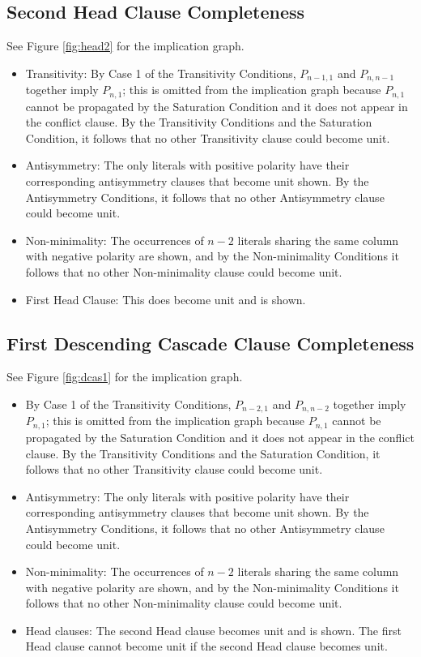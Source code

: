 \documentclass[a4paper,UKenglish,cleveref, autoref, thm-restate]{lipics-v2021}
\begin{document}
\subsection{Second Head Clause Completeness}
See Figure \ref{fig:head2} for the implication graph.
\begin{itemize}
    \item Transitivity: By Case 1 of the Transitivity Conditions, $P_{n - 1, 1}$ and $P_{n, n - 1}$ together imply $P_{n, 1}$; this is omitted from the implication graph because $P_{n, 1}$ cannot be propagated by the Saturation Condition and it does not appear in the conflict clause. By the Transitivity Conditions and the Saturation Condition, it follows that no other Transitivity clause could become unit.
    \item Antisymmetry: The only literals with positive polarity have their corresponding antisymmetry clauses that become unit shown. By the Antisymmetry Conditions, it follows that no other Antisymmetry clause could become unit. 
    \item Non-minimality: The occurrences of $n - 2$ literals sharing the same column with negative polarity are shown, and by the Non-minimality Conditions it follows that no other Non-minimality clause could become unit. 
    \item First Head Clause: This does become unit and is shown.
\end{itemize}

\subsection{First Descending Cascade Clause Completeness}
See Figure \ref{fig:dcas1} for the implication graph.
\begin{itemize}
    \item By Case 1 of the Transitivity Conditions, $P_{n - 2, 1}$ and $P_{n, n - 2}$ together imply $P_{n, 1}$; this is omitted from the implication graph because $P_{n, 1}$ cannot be propagated by the Saturation Condition and it does not appear in the conflict clause. By the Transitivity Conditions and the Saturation Condition, it follows that no other Transitivity clause could become unit. 
    \item Antisymmetry: The only literals with positive polarity have their corresponding antisymmetry clauses that become unit shown. By the Antisymmetry Conditions, it follows that no other Antisymmetry clause could become unit. 
    \item Non-minimality: The occurrences of $n - 2$ literals sharing the same column with negative polarity are shown, and by the Non-minimality Conditions it follows that no other Non-minimality clause could become unit. 
    \item Head clauses: The second Head clause becomes unit and is shown. The first Head clause cannot become unit if the second Head clause becomes unit. 
\end{itemize}
\end{document}
